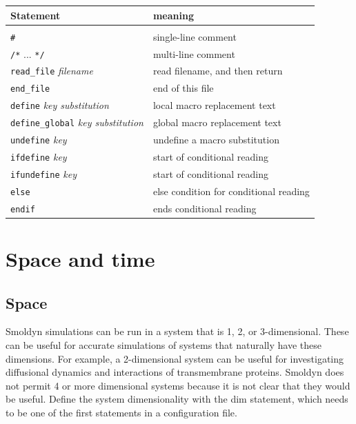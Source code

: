 \documentclass {book}
\newcommand {\ttt} {\texttt}
\newcommand {\param} {\textit}
\begin{document}
\begin{longtable}[c]{ll}
Statement & meaning\\
\hline\\
\ttt{\#} & single-line comment\\
\ttt{/*} ... \ttt{*/} & multi-line comment\\
\ttt{read\_file} \param{filename} & read filename, and then return\\
\ttt{end\_file} & end of this file\\
\ttt{define} \param{key substitution} & local macro replacement text\\
\ttt{define\_global} \param{key substitution} & global macro replacement text\\
\ttt{undefine} \param{key} & undefine a macro substitution\\
\ttt{ifdefine} \param{key} & start of conditional reading\\
\ttt{ifundefine} \param{key} & start of conditional reading\\
\ttt{else} & else condition for conditional reading\\
\ttt{endif} & ends conditional reading\\
\end{longtable}



\chapter{Space and time}

\section{Space}

Smoldyn simulations can be run in a system that is 1, 2, or 3-dimensional. These can be useful for accurate simulations of systems that naturally have these dimensions. For example, a 2-dimensional system can be useful for investigating diffusional dynamics and interactions of transmembrane proteins. Smoldyn does not permit 4 or more dimensional systems because it is not clear that they would be useful. Define the system dimensionality with the dim statement, which needs to be one of the first statements in a configuration file.
\end{document}
